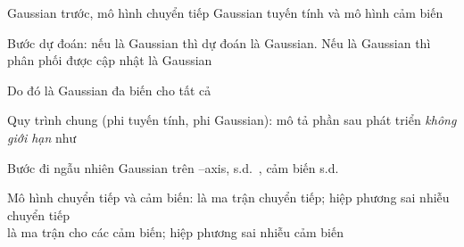 \documentclass{article}
\begin{document}
\begin{huge}
\vspace{0.2in}

\textwidth
{}

Gaussian trước, mô hình chuyển tiếp Gaussian tuyến tính và mô hình cảm biến



Bước dự đoán: nếu  là Gaussian thì dự đoán
\mat{\[
   \pv(\X_{t+1}|\e_{1:t}) =
  \int_{\sx_t}\pv(\X_{t+1}|\x_t)P(\x_t|\e_{1:t}) \,d\x_t
\]}
là Gaussian. Nếu  là Gaussian thì phân phối được cập nhật
\mat{\[
  \pv(\X_{t+1}|\e_{1:t+1}) =
  \alpha \pv(\e_{t+1}|\X_{t+1}) \pv(\X_{t+1}|\e_{1:t})
\]}
là Gaussian

Do đó  là Gaussian đa biến  cho tất cả 

Quy trình chung (phi tuyến tính, phi Gaussian):
mô tả phần sau phát triển \emph{không giới hạn} như 




Bước đi ngẫu nhiên Gaussian trên --axis, s.d.~, cảm biến s.d.~
\mat{\[
\mu_{t+1} = \frac{(\sigma_t^2+\sigma_x^2)z_{t+1} + \sigma_z^2\mu_t}
                   {\sigma_t^2+\sigma_x^2+\sigma_z^2}
\qquad\qquad 
\sigma_{t+1}^2 = \frac{(\sigma_t^2+\sigma_x^2)\sigma_z^2}
                        {\sigma_t^2+\sigma_x^2+\sigma_z^2}
\]}

\vspace*{0.2in}

\textwidth
{}



Mô hình chuyển tiếp và cảm biến:
\mat{\[
\begin{array}{rcl}
  P(\x_{t+1}|\x_t) & = & N(\kftm \x_t,\kftv)(\x_{t+1}) \\
  P(\z_t|\x_t) & = & N(\kfsm \x_t,\kfsv)(\z_t) 
\end{array}
\]}
\mat{$\kftm$} là ma trận chuyển tiếp; \mat{$\kftv$} hiệp phương sai nhiễu chuyển tiếp \\
\mat{$\kfsm$} là ma trận cho các cảm biến; \mat{$\kfsv$} hiệp phương sai nhiễu cảm biến


\end{huge}
\end{document}
